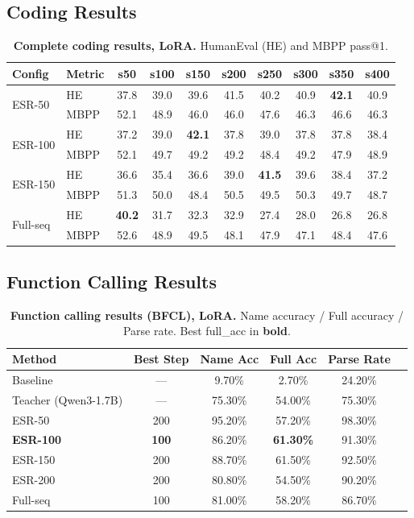 \documentclass{article}
\begin{document}
\subsection{Coding Results}

\begin{table}[!htbp]
\centering
\caption{\textbf{Complete coding results, LoRA.} HumanEval (HE) and MBPP pass@1.}
\label{tab:app_coding_lora}
\footnotesize
\begin{tabular}{llcccccccc}
\toprule
\textbf{Config} & \textbf{Metric} & \textbf{s50} & \textbf{s100} & \textbf{s150} & \textbf{s200} & \textbf{s250} & \textbf{s300} & \textbf{s350} & \textbf{s400} \\
\midrule
\multirow{2}{*}{ESR-50} & HE & 37.8 & 39.0 & 39.6 & 41.5 & 40.2 & 40.9 & \textbf{42.1} & 40.9 \\
 & MBPP & 52.1 & 48.9 & 46.0 & 46.0 & 47.6 & 46.3 & 46.6 & 46.3 \\
\midrule
\multirow{2}{*}{ESR-100} & HE & 37.2 & 39.0 & \textbf{42.1} & 37.8 & 39.0 & 37.8 & 37.8 & 38.4 \\
 & MBPP & 52.1 & 49.7 & 49.2 & 49.2 & 48.4 & 49.2 & 47.9 & 48.9 \\
\midrule
\multirow{2}{*}{ESR-150} & HE & 36.6 & 35.4 & 36.6 & 39.0 & \textbf{41.5} & 39.6 & 38.4 & 37.2 \\
 & MBPP & 51.3 & 50.0 & 48.4 & 50.5 & 49.5 & 50.3 & 49.7 & 48.7 \\
\midrule
\multirow{2}{*}{Full-seq} & HE & \textbf{40.2} & 31.7 & 32.3 & 32.9 & 27.4 & 28.0 & 26.8 & 26.8 \\
 & MBPP & 52.6 & 48.9 & 49.5 & 48.1 & 47.9 & 47.1 & 48.4 & 47.6 \\
\bottomrule
\end{tabular}
\end{table}


\subsection{Function Calling Results}

\begin{table}[!htbp]
\centering
\caption{\textbf{Function calling results (BFCL), LoRA.} Name accuracy / Full accuracy / Parse rate. Best full\_acc in \textbf{bold}.}
\label{tab:app_funcall}
\small
\begin{tabular}{lccccc}
\toprule
\textbf{Method} & \textbf{Best Step} & \textbf{Name Acc} & \textbf{Full Acc} & \textbf{Parse Rate} \\
\midrule
Baseline & --- & 9.70\% & 2.70\% & 24.20\% \\
Teacher (Qwen3-1.7B) & --- & 75.30\% & 54.00\% & 75.30\% \\
\midrule
ESR-50 & 200 & 95.20\% & 57.20\% & 98.30\% \\
\textbf{ESR-100} & \textbf{100} & 86.20\% & \textbf{61.30\%} & 91.30\% \\
ESR-150 & 200 & 88.70\% & 61.50\% & 92.50\% \\
ESR-200 & 200 & 80.80\% & 54.50\% & 90.20\% \\
Full-seq & 100 & 81.00\% & 58.20\% & 86.70\% \\
\bottomrule
\end{tabular}
\end{table}
\end{document}

